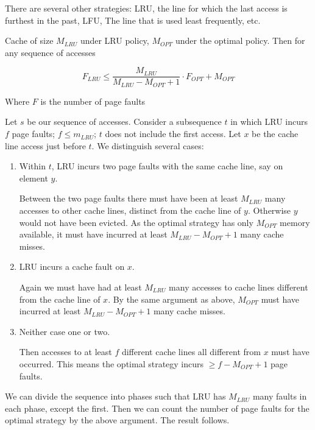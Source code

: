 There are several other strategies: LRU, the line for which the last access is furthest in the past, LFU, The line that is used least frequently, etc.

\begin{thm} Cache of size $M_{LRU}$ under LRU policy, $M_{OPT}$ under the optimal policy. Then 
for any sequence of accesses

\[F_{LRU} \leq \frac{M_{LRU}}{M_{LRU}-M_{OPT}+1} \cdot F_{OPT}+ M_{OPT}\]

Where $F$ is the number of page faults
\end{thm}

\begin{pr} Let $s$ be our sequence of accesses. Consider a subsequence $t$ in which LRU incurs $f$ page faults; $f\leq m_{LRU}$; $t$ does not include the first access. Let $x$ be the cache line access just before $t$. We distinguish several cases:

\begin{enumerate}
\item Within $t$, LRU incurs two page faults with the same cache line, say on element $y$. 

Between the two page faults there must have been at least $M_{LRU}$ many accesses to other cache lines, distinct from the cache line of $y$. Otherwise $y$ would not have been evicted. As the optimal strategy has only $M_{OPT}$ memory available, it must have incurred at least $M_{LRU}-M_{OPT}+1$ many cache misses.

\item LRU incurs a cache fault on $x$.

Again we must have had at least $M_{LRU}$ many accesses to cache lines different from the cache line of $x$. By the same argument as above, $M_{OPT}$ must have incurred at least $M_{LRU}-M_{OPT}+1$ many cache misses.

\item Neither case one or two.

Then accesses to at least $f$ different cache lines all different from $x$ must have occurred. This means the optimal strategy incurs $\geq f-M_{OPT}+1$ page faults.
\end{enumerate}

We can divide the sequence into phases such that LRU has $M_{LRU}$ many faults in each phase, except the first. Then we can count the number of page faults for the optimal strategy by the above argument. The result follows.
\end{pr}

